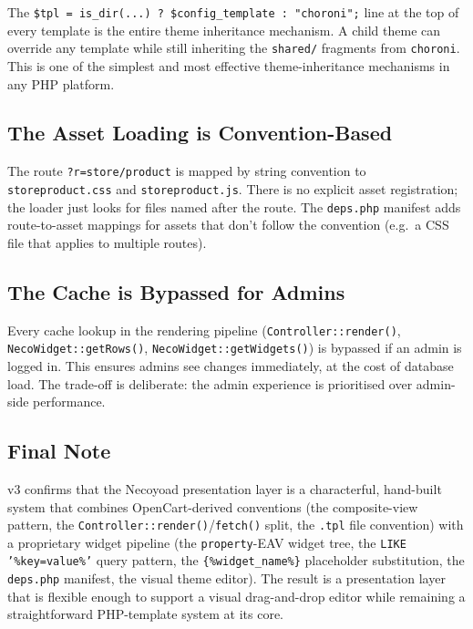 \documentclass[11pt,a4paper]{article}
\begin{document}
The \texttt{\$tpl = is\_dir(...) ? \$config\_template : "choroni";}
line at the top of every template is the entire theme inheritance
mechanism. A child theme can override any template while still
inheriting the \texttt{shared/} fragments from \texttt{choroni}.
This is one of the simplest and most effective theme-inheritance
mechanisms in any PHP platform.

\subsection{The Asset Loading is Convention-Based}

The route \texttt{?r=store/product} is mapped by string convention
to \texttt{storeproduct.css} and \texttt{storeproduct.js}. There
is no explicit asset registration; the loader just looks for files
named after the route. The \texttt{deps.php} manifest adds
route-to-asset mappings for assets that don't follow the convention
(e.g.\ a CSS file that applies to multiple routes).

\subsection{The Cache is Bypassed for Admins}

Every cache lookup in the rendering pipeline
(\texttt{Controller::render()}, \texttt{NecoWidget::getRows()},
\texttt{NecoWidget::getWidgets()}) is bypassed if an admin is
logged in. This ensures admins see changes immediately, at the
cost of database load. The trade-off is deliberate: the admin
experience is prioritised over admin-side performance.

\subsection{Final Note}

v3 confirms that the Necoyoad presentation layer is a
characterful, hand-built system that combines OpenCart-derived
conventions (the composite-view pattern, the
\texttt{Controller::render()}/\texttt{fetch()} split, the
\texttt{.tpl} file convention) with a proprietary widget pipeline
(the \texttt{property}-EAV widget tree, the
\texttt{LIKE '\%key=value\%'} query pattern, the
\texttt{\{\%widget\_name\%\}} placeholder substitution, the
\texttt{deps.php} manifest, the visual theme editor). The result
is a presentation layer that is flexible enough to support a
visual drag-and-drop editor while remaining a straightforward
PHP-template system at its core.
\end{document}
